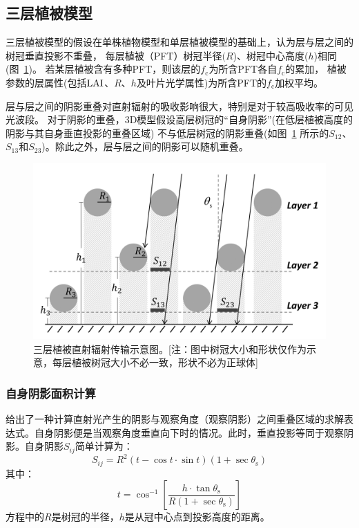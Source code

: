 \subsection{三层植被模型}
三层植被模型的假设在单株植物模型和单层植被模型的基础上，认为层与层之间的树冠垂直投影不重叠，
每层植被（PFT）树冠半径$(R$)、树冠中心高度($h$)相同(图~\ref{fig:三层植被结构示意图})。
若某层植被含有多种PFT，则该层的$f_{\mathrm {c}}$为所含PFT各自$f_{\mathrm {c}}$的累加，
植被参数的层属性(包括${\rm LAI}$、$R$、$h$及叶片光学属性)为所含PFT的$f_{\mathrm {c}}$加权平均。

层与层之间的阴影重叠对直射辐射的吸收影响很大，特别是对于较高吸收率的可见光波段。
对于阴影的重叠，3D模型假设高层树冠的“自身阴影”(在低层植被高度的阴影与其自身垂直投影的重叠区域)
不与低层树冠的阴影重叠(如图~\ref{fig:三层植被结构示意图} 所示的$S_{12}$、$S_{13}$和$S_{23}$)。除此之外，层与层之间的阴影可以随机重叠。%
{
  \begin{figure}[htbp]
    \centering
    \includegraphics[width=0.8\columnwidth]{Figures/辐射过程及辐射通量计算/三层植被结构示意图_v2.png}
    \caption[三层植被直射辐射传输示意图]{三层植被直射辐射传输示意图。[注：图中树冠大小和形状仅作为示意，每层植被树冠大小不必一致，形状不必为正球体]}
    \label{fig:三层植被结构示意图}
  \end{figure}
}

\subsubsection{自身阴影面积计算}

\citet{li1992GeometricopticalBidirectionalReflectance}给出了一种计算直射光产生的阴影与观察角度（观察阴影）之间重叠区域的求解表达式。自身阴影便是当观察角度垂直向下时的情况。此时，垂直投影等同于观察阴影。自身阴影$S_{ij}$简单计算为：
%
\begin{equation}
  S_{ij} = R^{2}\left( t - \cos t \cdot \sin t \right)\left( 1 + \sec\theta_{\mathrm{s}} \right)
\end{equation}
其中：
%
\begin{equation}
  t = \cos^{- 1}\left\lbrack \frac{h \cdot \tan\theta_{\mathrm{s}}}{R\left( 1 + \sec\theta_{\mathrm{s}} \right)} \right\rbrack
\end{equation}
%
方程中的\(R\)是树冠的半径，\(h\)是从冠中心点到投影高度的距离。

